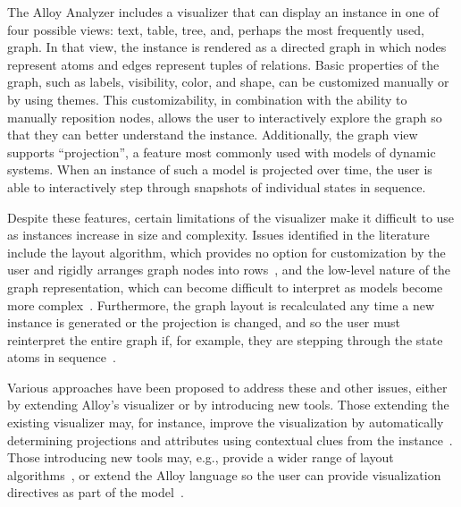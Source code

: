 \documentclass[runningheads]{llncs}
\begin{document}
The Alloy Analyzer includes a visualizer that can display an instance in one of four possible views: text, table, tree, and, perhaps the most frequently used, graph. In that view, the instance is rendered as a directed graph in which nodes represent atoms and edges represent tuples of relations. Basic properties of the graph, such as labels, visibility, color, and shape, can be customized manually or by using themes.
This customizability, in combination with the ability to manually reposition nodes, allows the user to interactively explore the graph so that they can better understand the instance. 
Additionally, the graph view supports ``projection'', a feature most commonly used with models of dynamic systems. When an instance of such a model is projected over time, the user is able to interactively step through snapshots of individual states in sequence.

Despite these features, certain limitations of the visualizer make it difficult to use as instances increase in size and complexity. 
Issues identified in the literature include the layout algorithm, which provides no option for customization by the user and rigidly arranges graph nodes into rows~\cite{couto2018,macedo2019}, and the low-level nature of the graph representation, which can become difficult to interpret as models become more complex~\cite{gammaitoni2014}. 
Furthermore, the graph layout is recalculated any time a new instance is generated or the projection is changed, and so the user must reinterpret the entire graph if, for example, they are stepping through the state atoms in sequence~\cite{couto2018,misue1995,zaman2013}.


Various approaches have been proposed to address these and other issues, either by extending Alloy's visualizer or by introducing new tools. Those extending the existing visualizer may, for instance, improve the visualization by automatically determining projections and attributes using contextual clues from the instance~\cite{zaman2013}. Those introducing new tools may, e.g., provide a wider range of layout algorithms~\cite{couto2018,macedo2019}, or extend the Alloy language so the user can provide visualization directives as part of the model~\cite{gammaitoni2014}.
\end{document}
